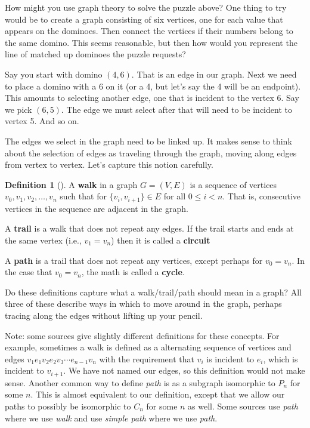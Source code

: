 \documentclass[10pt,]{book}
\newcommand{\terminology}[1]{\textbf{#1}}
\theoremstyle{plain}
\theoremstyle{definition}
\newtheorem{definition}[theorem]{Definition}
\theoremstyle{definition}
\theoremstyle{definition}
\numberwithin{equation}{chapter}
\newcommand{\lt}{<}
\begin{document}
\hypertarget{p-126}{}%
How might you use graph theory to solve the puzzle above?  One thing to try would be to create a graph consisting of six vertices, one for each value that appears on the dominoes.  Then connect the vertices if their numbers belong to the same domino.  This seems reasonable, but then how would you represent the line of matched up dominoes the puzzle requests?%
\par
\hypertarget{p-127}{}%
Say you start with domino \((4,6)\).  That is an edge in our graph.  Next we need to place a domino with a 6 on it (or a 4, but let's say the 4 will be an endpoint).  This amounts to selecting another edge, one that is incident to the vertex 6.  Say we pick \((6,5)\).  The edge we must select after that will need to be incident to vertex 5.  And so on.%
\par
\hypertarget{p-128}{}%
The edges we select in the graph need to be linked up.  It makes sense to think about the selection of edges as traveling through the graph, moving along edges from vertex to vertex.  Let's capture this notion carefully.%
\begin{definition}[{}]\label{def-walk}
\hypertarget{p-129}{}%
A \terminology{walk} in a graph \(G = (V,E)\) is a sequence of vertices \(v_0, v_1, v_2, \ldots, v_n\) such that for \(\{v_i, v_{i+1}\} \in E\) for all \(0 \le i \lt n\).  That is, consecutive vertices in the sequence are adjacent in the graph.%
\par
\hypertarget{p-130}{}%
A \terminology{trail} is a walk that does not repeat any edges.  If the trail starts and ends at the same vertex (i.e., \(v_1 = v_n\)) then it is called a \terminology{circuit}%
\par
\hypertarget{p-131}{}%
A \terminology{path} is a trail that does not repeat any vertices, except perhaps for \(v_0 = v_n\).  In the case that \(v_0 = v_n\), the math is called a \terminology{cycle}.%
\end{definition}
\hypertarget{p-132}{}%
Do these definitions capture what a walk/trail/path should mean in a graph?  All three of these describe ways in which to move around in the graph, perhaps tracing along the edges without lifting up your pencil.%
\par
\hypertarget{p-133}{}%
Note: some sources give slightly different definitions for these concepts.  For example, sometimes a walk is defined as a alternating sequence of vertices and edges \(v_1e_1v_2e_2v_3\cdots e_{n-1}v_n\) with the requirement that \(v_i\) is incident to \(e_i\), which is incident to \(v_{i+1}\).  We have not named our edges, so this definition would not make sense.  Another common way to define \emph{path} is as a subgraph isomorphic to \(P_n\) for some \(n\).  This is almost equivalent to our definition, except that we allow our paths to possibly be isomorphic to \(C_n\) for some \(n\) as well.  Some sources use \emph{path} where we use \emph{walk} and use \emph{simple path} where we use \emph{path}.%
\end{document}

